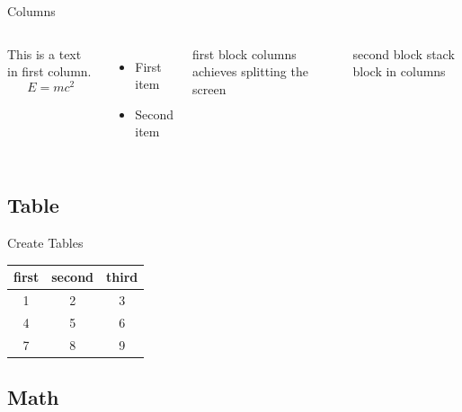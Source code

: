 \begin{frame}{Columns}
    \begin{columns}
        This is a text in first column.
        $$E=mc^2$$
        \begin{itemize}
        \item First item
        \item Second item
        \end{itemize}
        
        \begin{block}{first block}
            columns achieves splitting the screen
        \end{block}
        \begin{block}{second block}
            stack block in columns
        \end{block}
        
    \end{columns}
\end{frame}

\subsection{Table}

\begin{frame}{Create Tables}
    \begin{center}
        \begin{table}[!t]  
            \begin{tabular}{ccc}  
                \toprule   
                first&second&third\\ 
                \midrule       
                1 & 2 & 3 \\ 
                4 & 5 & 6 \\ 
                7 & 8 & 9 \\
                \bottomrule  
            \end{tabular}
        \end{table}
    \end{center}
\end{frame}

\subsection{Math}


